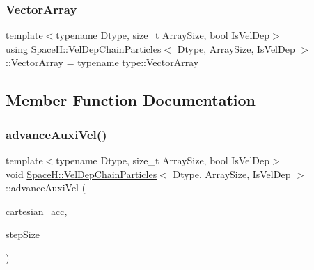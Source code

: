 \subsubsection{\texorpdfstring{Vector\+Array}{VectorArray}\hspace{0.1cm}{\footnotesize\ttfamily [2/2]}}
{\footnotesize\ttfamily template$<$typename Dtype, size\+\_\+t Array\+Size, bool Is\+Vel\+Dep$>$ \\
using \mbox{\hyperlink{class_space_h_1_1_vel_dep_chain_particles}{Space\+H\+::\+Vel\+Dep\+Chain\+Particles}}$<$ Dtype, Array\+Size, Is\+Vel\+Dep $>$\+::\mbox{\hyperlink{class_space_h_1_1_vel_indep_particles_aa9983058940249df8b00fa800e8cbad2}{Vector\+Array}} =  typename type\+::\+Vector\+Array}



\subsection{Member Function Documentation}
\mbox{\label{class_space_h_1_1_vel_dep_chain_particles_ac875237066008b4fa02feeacbbcb100a}} 
\subsubsection{\texorpdfstring{advance\+Auxi\+Vel()}{advanceAuxiVel()}\hspace{0.1cm}{\footnotesize\ttfamily [1/2]}}
{\footnotesize\ttfamily template$<$typename Dtype, size\+\_\+t Array\+Size, bool Is\+Vel\+Dep$>$ \\
void \mbox{\hyperlink{class_space_h_1_1_vel_dep_chain_particles}{Space\+H\+::\+Vel\+Dep\+Chain\+Particles}}$<$ Dtype, Array\+Size, Is\+Vel\+Dep $>$\+::advance\+Auxi\+Vel (\begin{DoxyParamCaption}\item[{const \mbox{\hyperlink{class_space_h_1_1_vel_indep_particles_aa9983058940249df8b00fa800e8cbad2}{Vector\+Array}} \&}]{cartesian\+\_\+acc,  }\item[{\mbox{\hyperlink{class_space_h_1_1_vel_indep_particles_aeb47d8131b30ed790320ff634f0d6af1}{Scalar}}}]{step\+Size }\end{DoxyParamCaption})\hspace{0.3cm}{\ttfamily [inline]}}



